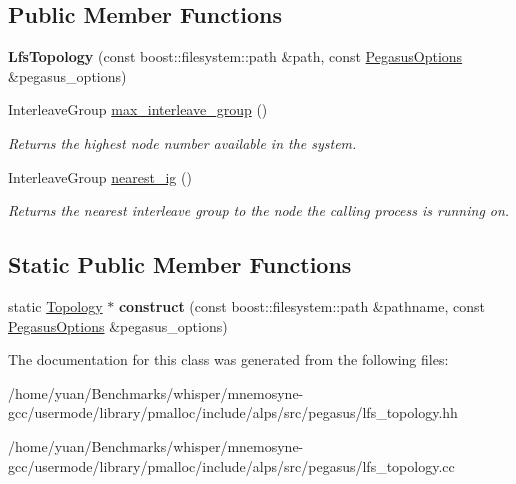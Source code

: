 \subsection*{Public Member Functions}
\begin{DoxyCompactItemize}
\item 
{\bfseries Lfs\+Topology} (const boost\+::filesystem\+::path \&path, const \hyperlink{structalps_1_1PegasusOptions}{Pegasus\+Options} \&pegasus\+\_\+options)\hypertarget{classalps_1_1LfsTopology_a53842f5efcd733fae7e582becbcde3f7}{}\label{classalps_1_1LfsTopology_a53842f5efcd733fae7e582becbcde3f7}

\item 
Interleave\+Group \hyperlink{classalps_1_1LfsTopology_a1c6476bae1c7aa63b9f36a9369d6b23f}{max\+\_\+interleave\+\_\+group} ()\hypertarget{classalps_1_1LfsTopology_a1c6476bae1c7aa63b9f36a9369d6b23f}{}\label{classalps_1_1LfsTopology_a1c6476bae1c7aa63b9f36a9369d6b23f}

\begin{DoxyCompactList}\small\item\em Returns the highest node number available in the system. \end{DoxyCompactList}\item 
Interleave\+Group \hyperlink{classalps_1_1LfsTopology_a5b3e607fc2273159b70f7278d43d5029}{nearest\+\_\+ig} ()\hypertarget{classalps_1_1LfsTopology_a5b3e607fc2273159b70f7278d43d5029}{}\label{classalps_1_1LfsTopology_a5b3e607fc2273159b70f7278d43d5029}

\begin{DoxyCompactList}\small\item\em Returns the nearest interleave group to the node the calling process is running on. \end{DoxyCompactList}\end{DoxyCompactItemize}
\subsection*{Static Public Member Functions}
\begin{DoxyCompactItemize}
\item 
static \hyperlink{classalps_1_1Topology}{Topology} $\ast$ {\bfseries construct} (const boost\+::filesystem\+::path \&pathname, const \hyperlink{structalps_1_1PegasusOptions}{Pegasus\+Options} \&pegasus\+\_\+options)\hypertarget{classalps_1_1LfsTopology_ae753f28a0cb3510278423386d83e2d14}{}\label{classalps_1_1LfsTopology_ae753f28a0cb3510278423386d83e2d14}

\end{DoxyCompactItemize}


The documentation for this class was generated from the following files\+:\begin{DoxyCompactItemize}
\item 
/home/yuan/\+Benchmarks/whisper/mnemosyne-\/gcc/usermode/library/pmalloc/include/alps/src/pegasus/lfs\+\_\+topology.\+hh\item 
/home/yuan/\+Benchmarks/whisper/mnemosyne-\/gcc/usermode/library/pmalloc/include/alps/src/pegasus/lfs\+\_\+topology.\+cc\end{DoxyCompactItemize}
